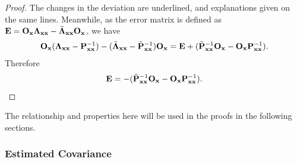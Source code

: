 \begin{proof}
The changes in the deviation are underlined, and explanations given on the same lines. Meanwhile, as the error matrix is defined as ${\bf E}={\bf O}_{\bf x}{\bf \Lambda}_{\bf xx}-{\tilde{\bf \Lambda}}_{\bf xx}{\bf O}_{\bf x}$, we have
\begin{equation*}
{\bf O}_{\bf x}({\bf \Lambda}_{\bf xx}-{\bf P}_{\bf xx}^{-1})-(\tilde{\bf \Lambda}_{\bf xx}-\tilde{\bf P}_{\bf xx}^{-1}){\bf O}_{\bf x}={\bf E}+(\tilde{\bf P}_{\bf xx}^{-1}{\bf O}_{\bf x}-{\bf O}_{\bf x}{\bf P}_{\bf xx}^{-1}).\\
\end{equation*}
Therefore
\begin{equation*}
{\bf E}=-(\tilde{\bf P}_{\bf xx}^{-1}{\bf O}_{\bf x}-{\bf O}_{\bf x}{\bf P}_{\bf xx}^{-1}).
\end{equation*}
\end{proof}
The relationship and properties here will be used in the proofs in the following sections.

\subsubsection{Estimated Covariance}

